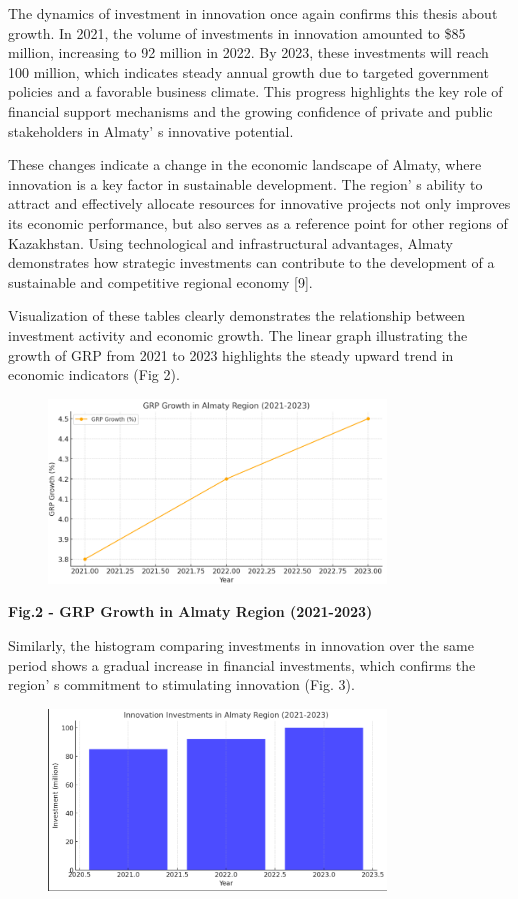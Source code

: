 The dynamics of investment in innovation once again confirms this thesis
about growth. In 2021, the volume of investments in innovation amounted
to \$85 million, increasing to 92 million in 2022. By 2023, these
investments will reach 100 million, which indicates steady annual growth
due to targeted government policies and a favorable business climate.
This progress highlights the key role of financial support mechanisms
and the growing confidence of private and public stakeholders in
Almaty' s innovative potential.

These changes indicate a change in the economic landscape of Almaty,
where innovation is a key factor in sustainable development. The
region' s ability to attract and effectively allocate
resources for innovative projects not only improves its economic
performance, but also serves as a reference point for other regions of
Kazakhstan. Using technological and infrastructural advantages, Almaty
demonstrates how strategic investments can contribute to the development
of a sustainable and competitive regional economy {[}9{]}.

Visualization of these tables clearly demonstrates the relationship
between investment activity and economic growth. The linear graph
illustrating the growth of GRP from 2021 to 2023 highlights the steady
upward trend in economic indicators (Fig 2).

\begin{figure}[H]
	\centering
	\includegraphics[width=0.8\textwidth]{media/ekon/image4}
	\caption*{}
\end{figure}


{\bfseries Fig.2 - GRP Growth in Almaty Region (2021-2023)}

Similarly, the histogram comparing investments in innovation over the
same period shows a gradual increase in financial investments, which
confirms the region' s commitment to stimulating
innovation (Fig. 3).

\begin{figure}[H]
	\centering
	\includegraphics[width=0.8\textwidth]{media/ekon/image5}
	\caption*{}
\end{figure}



